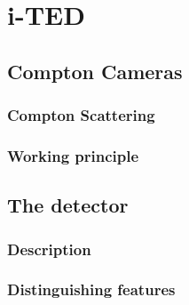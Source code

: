 \chapter{i-TED}\label{ch:detector}

\section{Compton Cameras}

\subsection{Compton Scattering}

\subsection{Working principle}

\section{The detector}

\subsection{Description}

\subsection{Distinguishing features}

